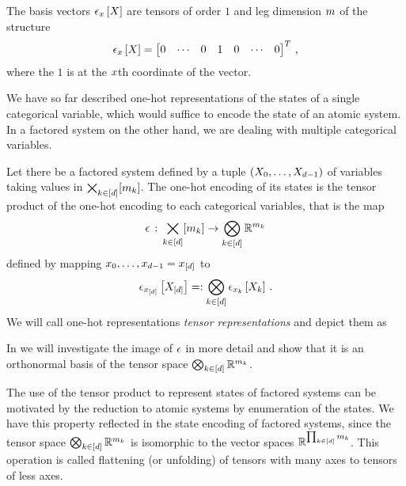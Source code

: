 The basis vectors $\epsilon_{x}\left[X\right]$ are tensors of order $1$ and leg dimension $m$ of the structure
\begin{align}
	\epsilon_{x}\left[X\right] = \begin{bmatrix}
	0 & \cdots & 0 & 1 & 0 & \cdots & 0
	\end{bmatrix}^T \, ,
\end{align}
where the $1$ is at the $x$th coordinate of the vector.

We have so far described one-hot representations of the states of a single categorical variable, which would suffice to encode the state of an atomic system.
In a factored system on the other hand, we are dealing with multiple categorical variables.

\begin{definition}\label{def:oneHotEncoding}
	Let there be a factored system defined by a tuple $(X_{0},\ldots,X_{d-1})$ of variables taking values in $\bigtimes_{k\in[d]}[m_{k}]$.
	The one-hot encoding of its states is the tensor product of the one-hot encoding to each categorical variables, that is the map
		\[ \epsilon\,:\,\bigtimes_{k\in[d]}[m_{k}] \rightarrow  \bigotimes_{k\in[d]} \mathbb{R}^{m_{k}} \]
	defined by mapping $x_{0},\ldots,x_{d-1}=x_{[d]}$ to
	\begin{align*}
		 \epsilon_{x_{[d]}}\left[X_{[d]}\right]
		=: \bigotimes_{k\in[d]} \epsilon_{x_{k}}\left[X_{k}\right] \, .
	\end{align*}
	We will call one-hot representations \emph{tensor representations} and depict them as
	\begin{center}
		
	\end{center}
\end{definition}

In  we will investigate the image of $\epsilon$ in more detail and show that it is an orthonormal basis of the tensor space $\bigotimes_{k\in[d]} \mathbb{R}^{m_{k}}$.

\begin{remark}
	The use of the tensor product to represent states of factored systems can be motivated by the reduction to atomic systems by enumeration of the states.
	We have this property reflected in the state encoding of factored systems, since the tensor space $\bigotimes_{k\in[d]} \mathbb{R}^{m_{k}}$ is isomorphic to the vector spaces $\mathbb{R}^{\prod_{k\in[d]}m_{k}}$.
	This operation is called flattening (or unfolding) of tensors with many axes to tensors of less axes.
\end{remark}

